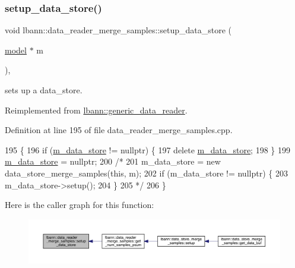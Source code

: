\subsubsection{\texorpdfstring{setup\+\_\+data\+\_\+store()}{setup\_data\_store()}}
{\footnotesize\ttfamily void lbann\+::data\+\_\+reader\+\_\+merge\+\_\+samples\+::setup\+\_\+data\+\_\+store (\begin{DoxyParamCaption}\item[{\hyperlink{classlbann_1_1model}{model} $\ast$}]{m }\end{DoxyParamCaption})\hspace{0.3cm}{\ttfamily [override]}, {\ttfamily [virtual]}}



sets up a data\+\_\+store. 



Reimplemented from \hyperlink{classlbann_1_1generic__data__reader_a8b2a09d38512fc11f1b9d572c89100a7}{lbann\+::generic\+\_\+data\+\_\+reader}.



Definition at line 195 of file data\+\_\+reader\+\_\+merge\+\_\+samples.\+cpp.


\begin{DoxyCode}
195                                                          \{
196   \textcolor{keywordflow}{if} (\hyperlink{classlbann_1_1generic__data__reader_aefc076b842933a882214f4f709ca49c9}{m\_data\_store} != \textcolor{keyword}{nullptr}) \{
197     \textcolor{keyword}{delete} \hyperlink{classlbann_1_1generic__data__reader_aefc076b842933a882214f4f709ca49c9}{m\_data\_store};
198   \}
199   \hyperlink{classlbann_1_1generic__data__reader_aefc076b842933a882214f4f709ca49c9}{m\_data\_store} = \textcolor{keyword}{nullptr};
200 \textcolor{comment}{/*}
201 \textcolor{comment}{  m\_data\_store = new data\_store\_merge\_samples(this, m);}
202 \textcolor{comment}{  if (m\_data\_store != nullptr) \{}
203 \textcolor{comment}{    m\_data\_store->setup();}
204 \textcolor{comment}{  \}}
205 \textcolor{comment}{*/}
206 \}
\end{DoxyCode}
Here is the caller graph for this function\+:\nopagebreak
\begin{figure}[H]
\begin{center}
\leavevmode
\includegraphics[width=350pt]{classlbann_1_1data__reader__merge__samples_a589d6997ad093721e8c2c2cb3197c9e2_icgraph}
\end{center}
\end{figure}
\mbox{\label{classlbann_1_1data__reader__merge__samples_ae5fe8d5cf8eb1a6aa715579d329a620e}} 
